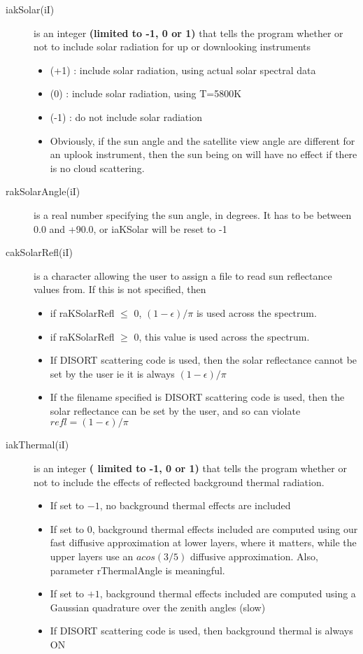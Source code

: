 \documentclass[12pt]{article}
\begin{document}
{\begin{description}
\item[{\sf iakSolar(iI)}] is an integer {\bf (limited to -1, 0 or 1)} that 
tells the program whether or not to include solar radiation for up
or downlooking instruments
\begin{itemize} 
\item (+1) : include solar radiation, using actual solar spectral data
\item (0)  : include solar radiation, using T=5800K
\item (-1) : do not include solar radiation
\item Obviously, if the sun angle and the satellite view angle are different 
      for an uplook instrument, then the sun being on will have no effect if
      there is no cloud scattering.
\end{itemize}

\item[{\sf rakSolarAngle(iI)}] is a real number specifying the sun angle, in
degrees.  It has to be between 0.0 and +90.0, or iaKSolar will be reset to -1

\item[{\sf cakSolarRefl(iI)}] is a character allowing the user to assign a 
file to read sun reflectance values from. If this is not specified, then 
  \begin{itemize}
    \item if raKSolarRefl $\le$ 0, $(1-\epsilon)/\pi$ is used across the spectrum.
    \item if raKSolarRefl $\ge$ 0, this value is used across the spectrum.
  \end{itemize}
\begin{itemize}
\item If DISORT scattering code is used, then the solar reflectance cannot be
  set by the user ie it is always $(1-\epsilon)/\pi$ 
\item If the filename specified is DISORT scattering code is used, then the 
  solar reflectance can be set by the user, and so can violate
  $refl = (1-\epsilon)/\pi$ 
\end{itemize}

\item[{\sf iakThermal(iI)}] is an integer {\bf( limited to -1, 0 or 1)} that
tells the program whether or not to include the effects of reflected
background thermal radiation.
\begin{itemize}
\item If set to $-1$, no background thermal effects are included
\item If set to $0$, background thermal effects included are computed
  using our fast diffusive approximation at lower layers, where it
  matters, while the upper layers use an $acos(3/5)$ diffusive
  approximation.  Also, parameter {\sf rThermalAngle} is meaningful.
\item If set to $+1$, background thermal effects included are computed
  using a Gaussian quadrature over the zenith angles (slow)
\item If DISORT scattering code is used, then background thermal is always ON
\end{itemize}


\end{description}}
\end{document}
